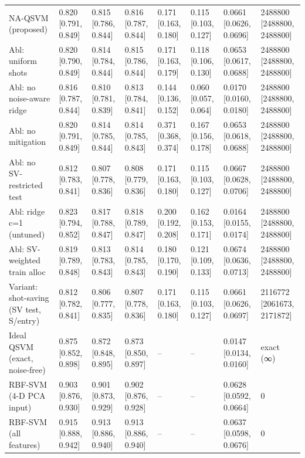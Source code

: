 \begin{table}[t]
\begin{tabular}{llllllll}
NA-QSVM (proposed) & 0.820 [0.791, 0.849] & 0.815 [0.786, 0.844] & 0.816 [0.787, 0.844] & 0.171 [0.163, 0.180] & 0.115 [0.103, 0.127] & 0.0661 [0.0626, 0.0696] & 2488800 [2488800, 2488800] \\
Abl: uniform shots & 0.820 [0.790, 0.849] & 0.814 [0.784, 0.844] & 0.815 [0.786, 0.844] & 0.171 [0.163, 0.179] & 0.118 [0.106, 0.130] & 0.0653 [0.0617, 0.0688] & 2488800 [2488800, 2488800] \\
Abl: no noise-aware ridge & 0.816 [0.787, 0.844] & 0.810 [0.781, 0.839] & 0.813 [0.784, 0.841] & 0.144 [0.136, 0.152] & 0.060 [0.057, 0.064] & 0.0170 [0.0160, 0.0180] & 2488800 [2488800, 2488800] \\
Abl: no mitigation & 0.820 [0.791, 0.849] & 0.814 [0.785, 0.844] & 0.814 [0.785, 0.843] & 0.371 [0.368, 0.374] & 0.167 [0.156, 0.178] & 0.0653 [0.0618, 0.0688] & 2488800 [2488800, 2488800] \\
Abl: no SV-restricted test & 0.812 [0.783, 0.841] & 0.807 [0.778, 0.836] & 0.808 [0.779, 0.836] & 0.171 [0.163, 0.180] & 0.115 [0.103, 0.127] & 0.0667 [0.0628, 0.0706] & 2488800 [2488800, 2488800] \\
Abl: ridge c=1 (untuned) & 0.823 [0.794, 0.852] & 0.817 [0.788, 0.847] & 0.818 [0.789, 0.847] & 0.200 [0.192, 0.208] & 0.162 [0.153, 0.171] & 0.0164 [0.0155, 0.0174] & 2488800 [2488800, 2488800] \\
Abl: SV-weighted train alloc & 0.819 [0.789, 0.848] & 0.813 [0.783, 0.843] & 0.814 [0.785, 0.843] & 0.180 [0.170, 0.190] & 0.121 [0.109, 0.133] & 0.0674 [0.0636, 0.0713] & 2488800 [2488800, 2488800] \\
Variant: shot-saving (SV test, S/entry) & 0.812 [0.782, 0.841] & 0.806 [0.777, 0.835] & 0.807 [0.778, 0.836] & 0.171 [0.163, 0.180] & 0.115 [0.103, 0.127] & 0.0661 [0.0626, 0.0697] & 2116772 [2061673, 2171872] \\
Ideal QSVM (exact, noise-free) & 0.875 [0.852, 0.898] & 0.872 [0.848, 0.895] & 0.873 [0.850, 0.897] & – & – & 0.0147 [0.0134, 0.0160] & exact (∞) \\
RBF-SVM (4-D PCA input) & 0.903 [0.876, 0.930] & 0.901 [0.873, 0.929] & 0.902 [0.876, 0.928] & – & – & 0.0628 [0.0592, 0.0664] & 0 \\
RBF-SVM (all features) & 0.915 [0.888, 0.942] & 0.913 [0.886, 0.940] & 0.913 [0.886, 0.940] & – & – & 0.0637 [0.0598, 0.0676] & 0 \\
\hline
\end{tabular}
\end{table}